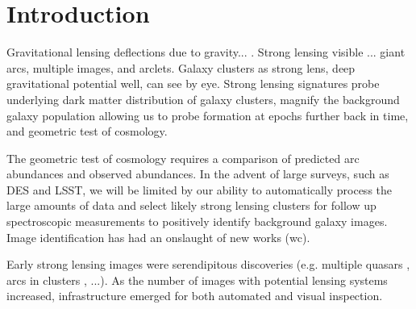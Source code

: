 \documentclass{emulateapj}
\begin{document}
\section{Introduction}

Gravitational lensing deflections due to gravity... \citep[see][for a
  review]{kneibandnatarajan_11}.  Strong lensing visible ... giant
arcs, multiple images, and arclets.  Galaxy clusters as strong lens,
deep gravitational potential well, can see by eye.  Strong lensing
signatures probe underlying dark matter distribution of galaxy
clusters, magnify the background galaxy population allowing us to
probe formation at epochs further back in time, and geometric test of
cosmology.

The geometric test of cosmology requires a comparison of predicted arc
abundances and observed abundances.  In the advent of large surveys,
such as DES and LSST, we will be limited by our ability to
automatically process the large amounts of data and select likely
strong lensing clusters for follow up spectroscopic measurements to
positively identify background galaxy images.  Image identification
has had an onslaught of new works (wc).

Early strong lensing images were serendipitous discoveries
(e.g. multiple quasars \citep{walsh_etal79}, arcs in clusters
\citep{lyndsandpetrosian_86}, ...).  As the number of images with
potential lensing systems increased, infrastructure emerged for both
automated and visual inspection.  

\end{document}
